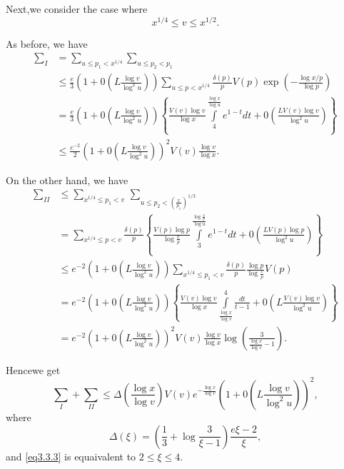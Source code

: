 Next,\pageoriginale we consider the case where
\begin{equation*}
x^{1/4} \le v \le x^{1/2}. \tag{3.3.3}\label{eq3.3.3}
\end{equation*}

As before, we have
\begin{align*}
  \sum_I &= \sum_{u \le p_1 < x^{1/4}} \sum_{u \le p_2 < p_1}\\
  &\le \frac{e}{3}\left(1+0\left(L \frac{\log v}{\log^2 u}\right)\right)
  \sum_{u \le p< x^{1/4}} \frac{\delta(p)}{p} V(p) \exp \left(-\frac{\log
  x/p}{\log p}\right)\\ 
  &= \frac{e}{3}\left(1+0\left(L \frac{\log v}{\log^2
    u}\right)\right)\left\{ \frac{V (v)\log 
    v}{\log x} \int \limits^{\frac{\log x}{\log u}}_4 e^{1-t}dt +
  0\left(\frac{LV(v)\log v}{\log^2 u}\right)\right\}\\ 
  & \le \frac{e^{-2}}{2}\left(1 + 0\left(L\frac{\log v}{\log^2 u}\right)\right)^2
  V(v)\frac{\log v}{\log x}.  
\end{align*}

On the other hand, we have 
\begin{align*}
  \sum_{II} & \le \sum_{ x^{1/4} \le p_1 < v} \,\sum_{u \le p_2 < (\frac{x}{p_1})^{1/3}} \\
  & = \sum_{x^{1/4}\le p < v} \frac{\delta(p)}{p}\left\{\frac {V(p)\log
    p}{\log\frac{x}{p}}\int \limits^{\frac{\log \frac{x}{p}}{\log
      u}}_3 e^{1-t}dt + 0\left(\frac{LV(p)\log p}{\log^2 u}\right)\right\}\\ 
  & \le e^{-2}\left(1+0\left(L \frac{\log v}{\log^2 u}\right)\right)
  \sum_{ x^{1/4} \le p_1 
    < v} \frac{\delta(p)}{p} \frac{\log p}{\log \frac{x}{p}}V(p)\\ 
  & = e^{-2}\left(1+0\left(L \frac{\log v}{\log^2 u}\right)\right)\left\{
  \frac{V(v)\log v}{\log 
    x} \int \limits^4_{\frac{\log x}{\log v}} \frac{dt}{t-1}+0\left(L
  \frac{V(v)\log v}{\log^2 u}\right)\right\}\\ 
  &=e^{-2}\left(1+0\left(L \frac{\log v}{\log^2 u}\right)\right)^2
  V(v)\frac{\log v}{\log x} 
  \log \left(\frac{3}{\frac{\log x}{\log v}-1}\right). 
\end{align*}

Hence\pageoriginale we get
$$
\sum_I + \sum_{II} \le \Delta \left(\frac{\log x}{\log
  v}\right)V(v)e^{-\frac{\log x}{\log v}}\left(1+0\left(L\frac{\log v}{\log^2
  u}\right)\right)^2, 
$$
where 
$$
\Delta(\xi)=\left(\frac{1}{3}+ \log \frac{3}{\xi -1}\right)\frac{e{\xi
    -2}}{\xi}, 
$$
and \eqref{eq3.3.3} is equaivalent to $2 \le \xi \le 4$.

